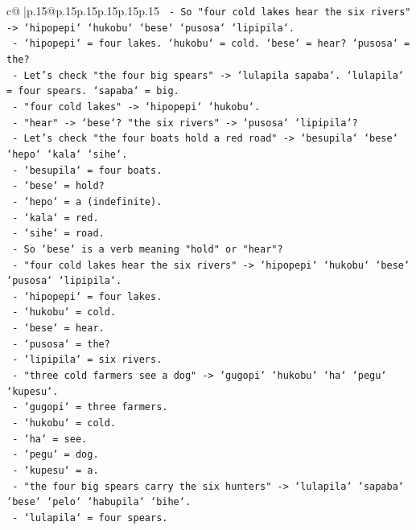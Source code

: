 \documentclass{article}
\begin{document}
{\begin{supertabular}{c@{$\;$}|p{.15\linewidth}@{}p{.15\linewidth}p{.15\linewidth}p{.15\linewidth}p{.15\linewidth}p{.15\linewidth}}
{{{\texttt{    {-} So "four cold lakes hear the six rivers" {-}> `hipopepi` `hukobu` `bese` `pusosa` `lipipila`.} \\
\texttt{    {-} `hipopepi` = four lakes. `hukobu` = cold. `bese` = hear? `pusosa` = the?} \\
\texttt{    {-} Let's check "the four big spears" {-}> `lulapila sapaba`. `lulapila` = four spears. `sapaba` = big.} \\
\texttt{    {-} "four cold lakes" {-}> `hipopepi` `hukobu`.} \\
\texttt{    {-} "hear" {-}> `bese`? "the six rivers" {-}> `pusosa` `lipipila`?} \\
\texttt{    {-} Let's check "the four boats hold a red road" {-}> `besupila` `bese` `hepo` `kala` `sihe`.} \\
\texttt{      {-} `besupila` = four boats.} \\
\texttt{      {-} `bese` = hold?} \\
\texttt{      {-} `hepo` = a (indefinite).} \\
\texttt{      {-} `kala` = red.} \\
\texttt{      {-} `sihe` = road.} \\
\texttt{    {-} So `bese` is a verb meaning "hold" or "hear"?} \\
\texttt{    {-} "four cold lakes hear the six rivers" {-}> `hipopepi` `hukobu` `bese` `pusosa` `lipipila`.} \\
\texttt{      {-} `hipopepi` = four lakes.} \\
\texttt{      {-} `hukobu` = cold.} \\
\texttt{      {-} `bese` = hear.} \\
\texttt{      {-} `pusosa` = the?} \\
\texttt{      {-} `lipipila` = six rivers.} \\
\texttt{    {-} "three cold farmers see a dog" {-}> `gugopi` `hukobu` `ha` `pegu` `kupesu`.} \\
\texttt{      {-} `gugopi` = three farmers.} \\
\texttt{      {-} `hukobu` = cold.} \\
\texttt{      {-} `ha` = see.} \\
\texttt{      {-} `pegu` = dog.} \\
\texttt{      {-} `kupesu` = a.} \\
\texttt{    {-} "the four big spears carry the six hunters" {-}> `lulapila` `sapaba` `bese` `pelo` `habupila` `bihe`.} \\
\texttt{      {-} `lulapila` = four spears.} \\
}}}
\end{supertabular}}
\end{document}
